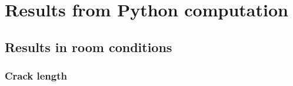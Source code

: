 
\chapter{Results from Python computation} %

\label{Appendix1} %

\section{Results in room conditions}

\subsection{Crack length}

